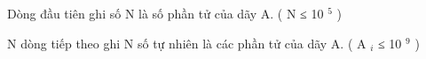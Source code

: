 Dòng đầu tiên ghi số N là số phần tử của dãy A. ( N ≤ 10   $^    5   $   )  

   N dòng tiếp theo ghi N số tự nhiên là các phần tử của dãy A. (  A   $_    i   $   ≤ 10   $^    9   $   )  

\